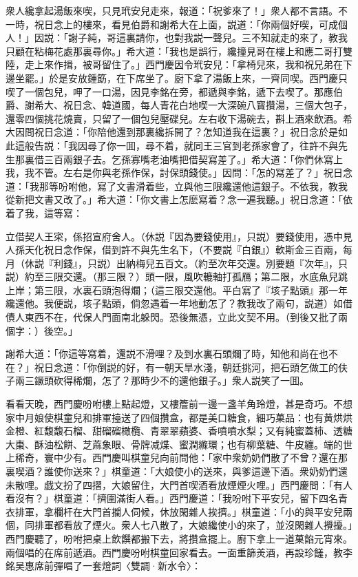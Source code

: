 衆人纔拿起湯飯來喫，只見玳安兒走來，報道：「祝爹來了！」衆人都不言語。不一時，祝日念上的樓來，看見伯爵和謝希大在上面，説道：「你兩個好喫，可成個人！」因説：「謝子純，哥這裏請你，也對我説一聲兒。三不知就走的來了，教我只顧在粘梅花處那裏尋你。」希大道：「我也是誤行，纔撞見哥在樓上和應二哥打雙陸，走上來作揖，被哥留住了。」西門慶因令玳安兒：「拿椅兒來，我和祝兄弟在下邊坐罷。」於是安放鍾筯，在下席坐了。廚下拿了湯飯上來，一齊同喫。西門慶只喫了一個包兒，呷了一口湯，因見李銘在旁，都遞與李銘，遞下去喫了。那應伯爵、謝希大、祝日念、韓道國，每人青花白地喫一大深碗八寳攢湯，三個大包子，還零四個挑花燒賣，只留了一個包兒壓碟兒。左右收下湯碗去，斟上酒來飲酒。希大因問祝日念道：「你陪他還到那裏纔拆開了？怎知道我在這裏？」祝日念於是如此這般告説：「我因尋了你一囬，尋不着，就同王三官到老孫家會了，往許不與先生那裏借三百兩銀子去。乞孫寡嘴老油嘴把借契寫差了。」希大道：「你們休寫上我，我不管。左右是你與老孫作保，討保頭錢使。」因問：「怎的冩差了？」祝日念道：「我那等吩咐他，寫了文書滑着些，立與他三限纔還他這銀子。不依我，教我從新把文書又改了。」希大道：「你文書上怎麽寫着？念一遍我聽。」祝日念道：「依着了我，這等寫：

立借契人王寀，係招宣府舍人。（休説『因為要錢使用』，只説）要錢使用，憑中見人孫天化祝日念作保，借到許不與先生名下，（不要説『白銀』）軟斯金三百兩，每月（休説『利錢』，只説）出納梅兒五百文。（約至次年交還。別要題『次年』，只説）約至三限交還。（那三限？）頭一限，風吹轆軸打孤鴈；第二限，水底魚兒跳上岸；第三限，水裏石頭泡得爛；（這三限交還他。平白寫了『垓子點頭』那一年纔還他。我便説，垓子點頭，倘忽遇着一年地動怎了？教我改了兩句，説道）如借債人東西不在，代保人門面南北躲閃。恐後無憑，立此文契不用。（到後又批了兩個字：）後空。」

謝希大道：「你這等寫着，還説不滑哩？及到水裏石頭爛了時，知他和尚在也不在？」祝日念道：「你倒説的好，有一朝天旱水淺，朝廷挑河，把石頭乞做工的伕子兩三鐝頭砍得稀爛，怎了？那時少不的還他銀子。」衆人説笑了一囬。

看看天晚，西門慶吩咐樓上點起燈，又樓簷前一邊一盞羊角玲燈，甚是奇巧。不想家中月娘使棋童兒和排軍擡送了四個攢盒，都是美口糖食，細巧菓品：也有黄烘烘金橙、紅馥馥石榴、甜磂磂橄欖、青翠翠蘋婆、香噴噴水梨；又有純蜜蓋柿、透糖大棗、酥油松餅、芝蔴象眼、骨牌减煠、蜜潤縧環；也有柳葉糖、牛皮纏。端的世上稀奇，寰中少有。西門慶叫棋童兒向前問他：「家中衆奶奶們散了不曾？還在那裏喫酒？誰使你送來？」棋童道：「大娘使小的送來，與爹這邊下酒。衆奶奶們還未散哩。戯文扮了四摺，大娘留住，大門首喫酒看放煙煙火哩。」西門慶問：「有人看沒有？」棋童道：「擠圍滿街人看。」西門慶道：「我吩咐下平安兒，留下四名青衣排軍，拿欄杆在大門首攔人伺候，休放閑雜人挨擠。」棋童道：「小的與平安兒兩個，同排軍都看放了煙火。衆人七八散了，大娘纔使小的來了，並沒閑雜人攪擾。」西門慶聽了，吩咐把桌上飲饌都搬下去，將攢盒擺上。廚下拿上一道菓餡元宵來。兩個唱的在席前遞酒。西門慶吩咐棋童回家看去。一面重篩羙酒，再設珍饈，教李銘吴惠席前彈唱了一套燈詞〈雙調·新水令〉：

